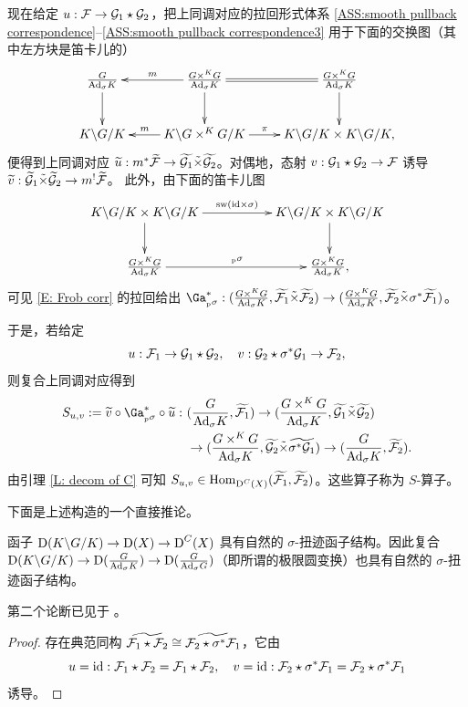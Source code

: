 \begin{construction}
现在给定 $u: {\mathcal F}\to {\mathcal G}_1\star {\mathcal G}_2$，把上同调对应的拉回形式体系 \eqref{ASS:smooth pullback correspondence}--\eqref{ASS:smooth pullback correspondence3} 用于下面的交换图（其中左方块是笛卡儿的）
\[\xymatrix{
\frac{G}{\Ad_\sigma K}\ar[d]&\ar_-m[l]\frac{G\times^KG}{\Ad_\sigma K}\ar@{=}[r]\ar[d]&\frac{G\times^KG}{\Ad_\sigma K}\ar[d]\\
K\backslash G/K&\ar_-m[l] K\backslash G\times^KG/K\ar^-\pi[r]& K\backslash G/K\times K\backslash G/K,
}\]
便得到上同调对应 $\widetilde u: m^*\widetilde{{\mathcal F}}\to \widetilde{{\mathcal G}_1}\tilde\times\widetilde{{\mathcal G}_2}$。对偶地，态射 $v: {\mathcal G}_1\star{\mathcal G}_2\to {\mathcal F}$ 诱导 $\widetilde v: \widetilde{{\mathcal G}}_1\tilde\times\widetilde{{\mathcal G}}_2\to m^!\widetilde{{\mathcal F}}$。
此外，由下面的笛卡儿图
\[
\xymatrix{
K\backslash G/K\times K\backslash G/K\ar^-{\on{sw}(\id\times\sigma)}[rr]\ar[d]&& K\backslash G/K\times K\backslash G/K\ar[d]\\
\frac{G\times^KG}{\Ad_\sigma K}\ar^{\pFr}[rr]&& \frac{G\times^KG}{\Ad_\sigma K},
}\]
可见 \eqref{E: Frob corr} 的拉回给出 $\Ga_{\pFr}^*: (\frac{G\times^KG}{\Ad_\sigma K}, \widetilde{\mF_1}\tilde\times\widetilde{\mF_2})\to (\frac{G\times^KG}{\Ad_\sigma K}, \widetilde{\mF_2}\tilde\times \sigma^*\widetilde{\mF_1})$。

于是，若给定
\[u: {\mathcal F}_1\to {\mathcal G}_1\star {\mathcal G}_2,\quad v: {\mathcal G}_2\star \sigma^*{\mathcal G}_1\to {\mathcal F}_2,\]
则复合上同调对应得到
\[
\begin{aligned}
S_{u,v}:=\widetilde v \circ  \Ga_{{_p}\sigma}^* \circ \widetilde u:\ &( \frac{G}{\Ad_\sigma K},\widetilde{\mF_1})\to (\frac{G\times^KG}{\Ad_\sigma K},\widetilde{\mG_1}\tilde\times\widetilde{\mG_2})\\
&\to (\frac{G\times^KG}{\Ad_\sigma K}, \widetilde{\mG_2}\tilde\times\widetilde{\sigma^*\mG_1})\to (\frac{G}{\Ad_\sigma K},\widetilde{\mF_2}).
\end{aligned}
\]由引理 \ref{L: decom of C} 可知 $S_{u,v}\in {\operatorname{Hom}}_{\operatorname{D}^{C}(X)}(\widetilde{{\mathcal F}_1},\widetilde{{\mathcal F}_2})$。这些算子称为 $S$-算子。
\end{construction}

下面是上述构造的一个直接推论。

\begin{cor}
\label{C:trace str on tilde}
函子 $\operatorname{D}(K\backslash G/K)\to \operatorname{D}(X)\to \operatorname{D}^{C}(X)$ 具有自然的 $\sigma$-扭迹函子结构。因此复合 $\operatorname{D}(K\backslash G/K)\to \operatorname{D}(\frac{G}{{\operatorname{Ad}}_\sigma K})\to \operatorname{D}(\frac{G}{{\operatorname{Ad}}_\sigma G})$（即所谓的极限圆变换）也具有自然的 $\sigma$-扭迹函子结构。
\end{cor}
第二个论断已见于 \cite{BFO,BN,Lu3}。
\begin{proof}
存在典范同构 $\widetilde{{\mathcal F}_1\star{\mathcal F}_2}\cong\widetilde{{\mathcal F}_2\star \sigma^*{\mathcal F}_1}$，它由
\[u={\operatorname{id}}: {\mathcal F}_1\star{\mathcal F}_2={\mathcal F}_1\star{\mathcal F}_2,\quad v={\operatorname{id}}: {\mathcal F}_2\star \sigma^*{\mathcal F}_1={\mathcal F}_2\star \sigma^*{\mathcal F}_1\]
诱导。
\end{proof}

